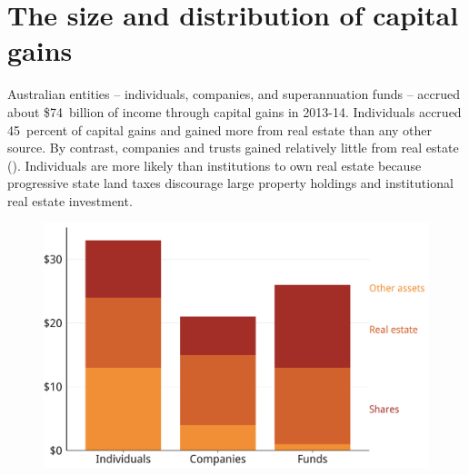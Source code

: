 \oneraggedpage
\section{The size and distribution of capital gains}




Australian entities -- individuals, companies, and superannuation funds -- accrued about \$74~billion of income through capital gains in 2013-14. Individuals accrued 45~percent
of capital gains and gained more from real estate than any other source. By contrast, companies and trusts gained relatively little from real estate (). Individuals are more likely than institutions to own real estate because progressive state land taxes discourage large property holdings and institutional real estate investment.


\begin{figure}
\label{fig:CGT-by-entity-asset}
\includegraphics[width=\columnwidth]{CGT-NG-atlas/b5-atlas/CGT-Figure1-1}

\end{figure}

